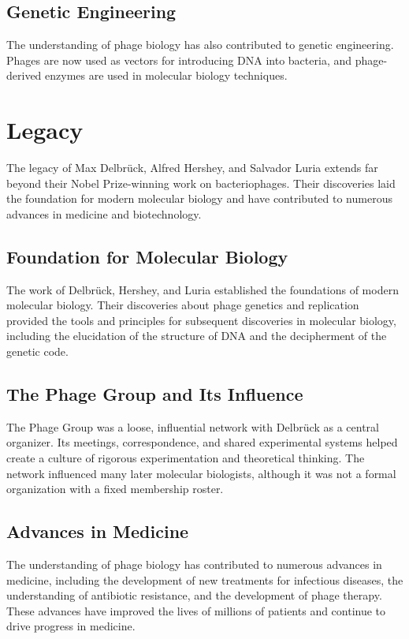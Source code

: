 \subsection{Genetic Engineering}

The understanding of phage biology has also contributed to genetic engineering. Phages are now used as vectors for introducing DNA into bacteria, and phage-derived enzymes are used in molecular biology techniques.

\section{Legacy}

The legacy of Max Delbr\"uck, Alfred Hershey, and Salvador Luria extends far beyond their Nobel Prize-winning work on bacteriophages. Their discoveries laid the foundation for modern molecular biology and have contributed to numerous advances in medicine and biotechnology.

\subsection{Foundation for Molecular Biology}

The work of Delbr\"uck, Hershey, and Luria established the foundations of modern molecular biology. Their discoveries about phage genetics and replication provided the tools and principles for subsequent discoveries in molecular biology, including the elucidation of the structure of DNA and the decipherment of the genetic code.

\subsection{The Phage Group and Its Influence}

The Phage Group was a loose, influential network with Delbr\"uck as a central organizer. Its meetings, correspondence, and shared experimental systems helped create a culture of rigorous experimentation and theoretical thinking. The network influenced many later molecular biologists, although it was not a formal organization with a fixed membership roster.

\subsection{Advances in Medicine}

The understanding of phage biology has contributed to numerous advances in medicine, including the development of new treatments for infectious diseases, the understanding of antibiotic resistance, and the development of phage therapy. These advances have improved the lives of millions of patients and continue to drive progress in medicine.

